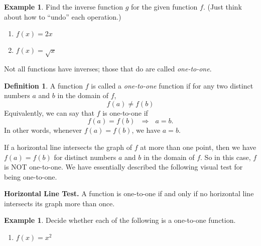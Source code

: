 \documentclass[letterpaper,12pt,oneside]{book}
\theoremstyle{definition}
\newtheorem{definition}[theorem]{Definition}
\newtheorem{example}[theorem]{Example}
\begin{document}
{\begin{example}
Find the inverse function $g$ for the given function $f$. (Just think about how to ``undo'' each operation.)
\begin{enumerate}
\item $f(x)=2x$
\vfill
\item $f(x)=\sqrt{x}$
\vfill
\end{enumerate}
\end{example}

\noindent
Not all functions have inverses; those that do are called \emph{one-to-one}.

\begin{definition}
A function $f$ is called a \emph{one-to-one} function if for any two distinct numbers $a$ and $b$ in the domain of $f$,
\[
f(a)\neq f(b)
\]
Equivalently, we can say that $f$ is one-to-one if
\[
f(a)=f(b) \ \ \ \Rightarrow \ \ \ a=b.
\]
In other words, whenever $f(a)=f(b)$, we have $a=b$.
\end{definition}

If a horizontal line intersects the graph of $f$ at more than one point, then we have $f(a)=f(b)$ for distinct numbers $a$ and $b$ in the domain of $f$.  So in this case, $f$ is NOT one-to-one.  We have essentially described the following visual test for being one-to-one.

\smallskip

\noindent
\textbf{Horizontal Line Test.} A function is one-to-one if and only if no horizontal line intersects its graph more than once.

\begin{example}
Decide whether each of the following is a one-to-one function.
\begin{multicols}{2}
\begin{enumerate}
\item $f(x)=x^2$



\end{enumerate}
\end{multicols}
\end{example}}
\end{document}
